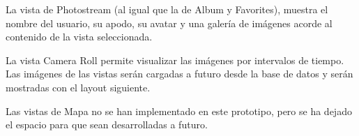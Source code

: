 \documentclass{memoria}
\begin{document}
\newpage

La vista de Photostream (al igual que la de Album y Favorites), muestra el nombre del usuario, su apodo, su avatar y una galería de imágenes acorde al contenido de la vista seleccionada.

La vista Camera Roll permite visualizar las imágenes por intervalos de tiempo. Las imágenes de las vistas serán cargadas a futuro desde la base de datos y serán mostradas con el layout siguiente.

\newpage

Las vistas de Mapa no se han implementado en este prototipo, pero se ha dejado el espacio para que sean desarrolladas a futuro.
\end{document}
